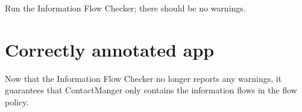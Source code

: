     Run the Information Flow Checker; there should be no warnings.
  \section{Correctly annotated app}  
     Now that the Information Flow Checker no longer reports any warnings, it guarantees that
     ContactManger only contains the information flows in the flow policy.  

 
%
%
%
%
